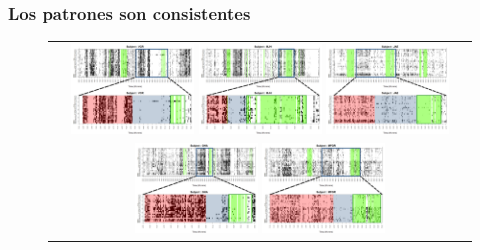 \documentclass[serif,mathserif,professionalfont]{beamer}
\begin{document}
\begin{frame}\frametitle{Los patrones son consistentes}
\begin{figure}
\begin{tabular}{c}
\includegraphics[width=0.3\textwidth]
{./img_ejemplos/zoom_VCR.pdf}
\includegraphics[width=0.3\textwidth]
{./img_ejemplos/zoom_MJH.pdf}
\includegraphics[width=0.3\textwidth]
{./img_ejemplos/zoom_JAE.pdf}
\\
\includegraphics[width=0.3\textwidth]
{./img_ejemplos/zoom_GHA.pdf}
\includegraphics[width=0.3\textwidth]
{./img_ejemplos/zoom_MFGR.pdf}
\end{tabular}
\end{figure}
\end{frame}
\end{document}
